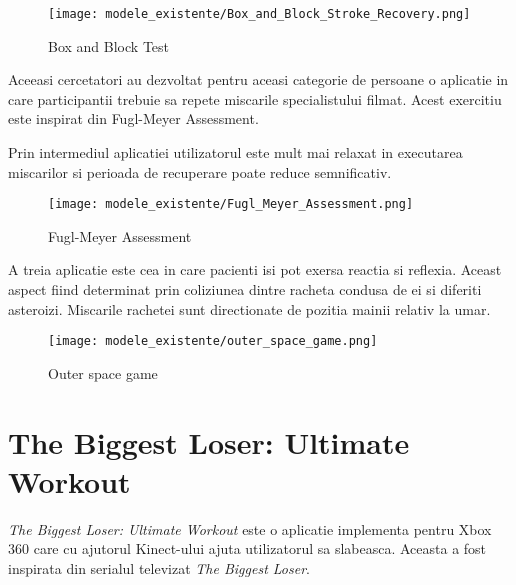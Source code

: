 \documentclass[12pt,a4paper]{report}
\begin{document}
\begin{figure}[th]
\centering
\texttt{[image: modele\_existente/Box\_and\_Block\_Stroke\_Recovery.png]}
  \caption[Box and Block Test]{Box and Block Test\protect\footnotemark}
  \label{figure_1:picture_2}
\end{figure}

Aceeasi cercetatori au dezvoltat pentru aceasi categorie de persoane o aplicatie in care participantii trebuie sa repete miscarile specialistului filmat. Acest exercitiu este inspirat din Fugl-Meyer Assessment.

Prin intermediul aplicatiei utilizatorul este mult mai relaxat in executarea miscarilor si perioada de recuperare poate reduce semnificativ.

\begin{figure}[th]
\centering
\texttt{[image: modele\_existente/Fugl\_Meyer\_Assessment.png]}
  \caption[Fugl-Meyer Assessment]{Fugl-Meyer Assessment\protect\footnotemark}
  \label{figure_1:picture_3}
\end{figure}

A treia aplicatie este cea in care pacienti isi pot exersa reactia si reflexia. Aceast aspect fiind determinat prin coliziunea dintre racheta condusa de ei si diferiti asteroizi. Miscarile rachetei sunt directionate de pozitia mainii relativ la umar.

\begin{figure}[th]
\centering
\texttt{[image: modele\_existente/outer\_space\_game.png]}
  \caption[Outer space game]{Outer space game\protect\footnotemark}
  \label{figure_1:picture_4}
\end{figure}

\section{The Biggest Loser: Ultimate Workout}

\textit{The Biggest Loser: Ultimate Workout} este o aplicatie implementa pentru Xbox 360 care cu ajutorul Kinect-ului ajuta utilizatorul sa slabeasca. Aceasta a fost inspirata din serialul televizat \textit{The Biggest Loser}. 
\end{document}
